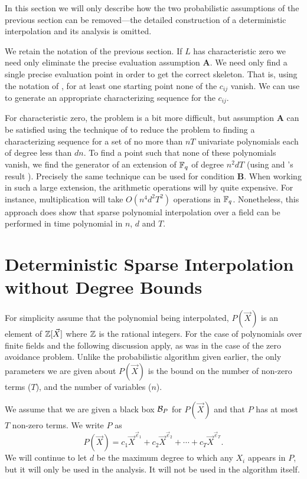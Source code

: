 In this section we will only describe how the two probabilistic
assumptions of the previous section can be removed---the detailed
construction of a deterministic interpolation and its analysis is
omitted.   

We retain the notation of the previous section.  If $L$ has
characteristic zero we need only eliminate the precise evaluation
assumption {\bf A}.  We need only find a single precise evaluation
point in order to get the correct skeleton.    That is, using the
notation of , for at least one starting
point none of the $c_{ij}$ vanish.  We can use
 to generate an appropriate characterizing
sequence for the $c_{ij}$.

For characteristic zero, the problem is a bit more difficult, but
assumption {\bf A} can be satisfied using the technique of
 to reduce the problem to finding a
characterizing sequence for a set of no more than $nT$ univariate
polynomials each of degree less than $dn$.  To find a point such that
none of these polynomials vanish, we find the generator of an
extension of $\mathbb{F}_q$ of degree $n^2dT$ (using {\Adleman} and
{\LenstraH}'s result \cite{Adelman1986-kb}).  Precisely the same technique
can be used for condition {\bf B}.  When working in such a large
extension, the arithmetic operations will by quite expensive.  For
instance, multiplication will take $O(n^4 d^2 T^2)$ operations in
$\mathbb{F}_q$.  Nonetheless, this approach does show that sparse polynomial
interpolation over a field can be performed in time polynomial in $n$,
$d$ and $T$.

\section{Deterministic Sparse Interpolation without Degree Bounds}
\label{Interp:BenOr:Sec}

For simplicity assume that the polynomial being interpolated, $P(\vec
X)$ is an element of $\mathbb{Z}[\vec X]$ where $\mathbb{Z}$ is the rational integers.
For the case of polynomials over finite fields
 and the following discussion apply, as was
in the case of the zero avoidance problem.  Unlike the probabilistic
algorithm given earlier, the only parameters we are given about
$P(\vec X)$ is the bound on the number of non-zero terms ($T$), and
the number of variables ($n$).

We assume that we are given a black box ${\cal B}_P$ for $P(\vec{X})$
and that $P$ has at most $T$ non-zero terms.  We write $P$ as
\[
P(\vec X) = c_1 {\vec X}^{\vec e_1} + c_2 {\vec X}^{\vec e_2} + \cdots +
c_T {\vec X}^{\vec e_T}.
\]
We will continue to let $d$ be the maximum degree to which any
$X_i$ appears in $P$, but it will only be used in the analysis.  It
will not be used in the algorithm itself.

